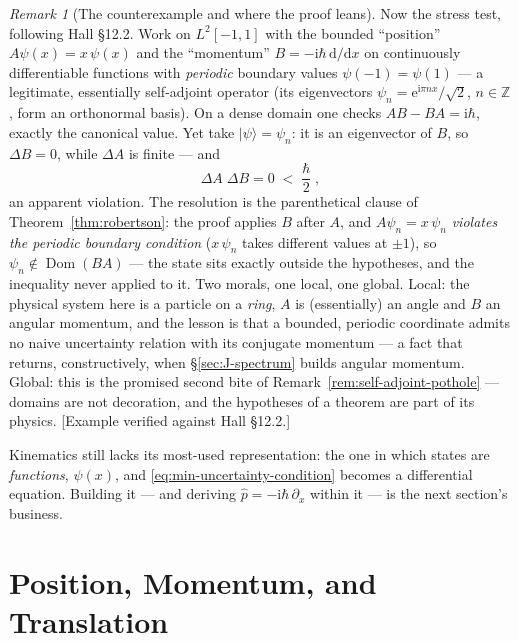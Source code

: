 \documentclass[11pt]{article}
\theoremstyle{plain}
\theoremstyle{definition}
\theoremstyle{remark}
\newtheorem{remark}[theorem]{Remark}
\newcommand{\dd}{\mathrm{d}}
\newcommand{\ee}{\mathrm{e}}
\newcommand{\ii}{\mathrm{i}}
\newcommand{\op}[1]{\hat{#1}}
\newcommand{\ket}[1]{\lvert #1 \rangle}
\begin{document}
\begin{remark}[The counterexample and where the proof leans]
\label{rem:uncertainty-counterexample}
Now the stress test, following Hall \S12.2. Work on
$L^2[-1, 1]$ with the bounded ``position'' $A\psi(x) = x\,\psi(x)$
and the ``momentum'' $B = -\ii\hbar\,\dd/\dd x$ on continuously
differentiable functions with \emph{periodic} boundary values
$\psi(-1) = \psi(1)$ --- a legitimate, essentially self-adjoint
operator (its eigenvectors $\psi_n = \ee^{\ii\pi n x}/\sqrt2$,
$n \in \mathbb Z$, form an orthonormal basis). On a dense domain
one checks $AB - BA = \ii\hbar$, exactly the canonical value. Yet
take $\ket\psi = \psi_n$: it is an eigenvector of $B$, so
$\Delta B = 0$, while $\Delta A$ is finite --- and
\begin{equation}
  \Delta A\;\Delta B = 0 \;<\; \frac\hbar2\;,
\end{equation}
an apparent violation. The resolution is the parenthetical clause of
Theorem~\ref{thm:robertson}: the proof applies $B$ after $A$, and
$A\psi_n = x\,\psi_n$ \emph{violates the periodic boundary
condition} ($x\,\psi_n$ takes different values at $\pm1$), so
$\psi_n \notin \operatorname{Dom}(BA)$ --- the state sits exactly
outside the hypotheses, and the inequality never applied to it. Two
morals, one local, one global. Local: the physical system here is a
particle on a \emph{ring}, $A$ is (essentially) an angle and $B$ an
angular momentum, and the lesson is that a bounded, periodic
coordinate admits no naive uncertainty relation with its conjugate
momentum --- a fact that returns, constructively, when
\S\ref{sec:J-spectrum} builds angular momentum. Global: this is the
promised second bite of Remark~\ref{rem:self-adjoint-pothole} ---
domains are not decoration, and the hypotheses of a theorem
are part of its physics. [Example verified against Hall \S12.2.]
\end{remark}

\medskip
\noindent
Kinematics still lacks its most-used representation: the one in
which states are \emph{functions}, $\psi(x)$, and
\eqref{eq:min-uncertainty-condition} becomes a differential
equation. Building it --- and deriving
$\op p = -\ii\hbar\,\partial_x$ within it --- is the next section's
business.


\section{Position, Momentum, and Translation}
\label{sec:position-momentum}
\end{document}
